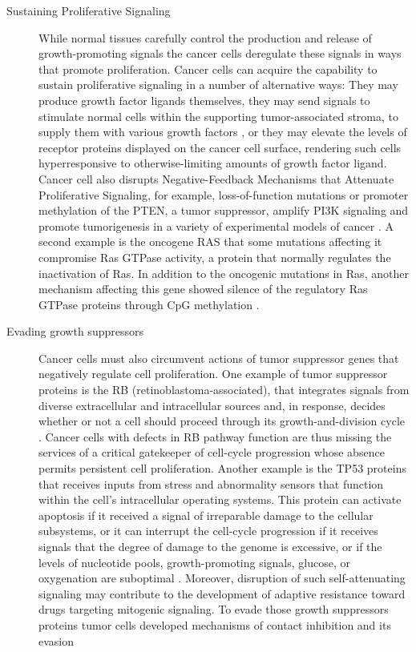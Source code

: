 \begin{description}
  \item [Sustaining Proliferative Signaling]
  While normal tissues carefully control the production and release of growth-promoting
  signals the cancer cells deregulate these signals in ways that promote proliferation.
    Cancer cells can acquire the capability to sustain proliferative signaling in a number of alternative ways: They may produce growth factor ligands themselves, they may send signals to stimulate normal cells within the supporting tumor-associated stroma, to supply them with various growth factors \cite{cheng2008transforming}, or
   they may elevate the levels of receptor proteins displayed on the cancer cell surface,
   rendering such cells hyperresponsive to otherwise-limiting amounts of growth factor ligand.
   Cancer cell also disrupts Negative-Feedback Mechanisms that Attenuate Proliferative Signaling,
   for example,  loss-of-function mutations or promoter methylation of the PTEN, a tumor suppressor, amplify PI3K signaling and promote tumorigenesis in a variety of experimental models of cancer \cite{jiang2009pi3k}. A second example is the oncogene RAS that some mutations affecting it compromise Ras GTPase activity,  a protein that normally regulates the inactivation of Ras. In addition to the oncogenic mutations in Ras, another mechanism affecting this gene showed silence of the regulatory Ras GTPase proteins through CpG methylation \cite{jin2007epigenetic}.
   \item [Evading growth suppressors]  Cancer cells must also circumvent actions of tumor suppressor genes that negatively regulate cell proliferation. One example of tumor suppressor proteins is the  RB (retinoblastoma-associated),
   that integrates signals from diverse extracellular and intracellular sources and, in response, decides whether or not a cell should proceed through its growth-and-division cycle \cite{burkhart2008cellular}.
   Cancer cells with defects in RB pathway function are thus missing the services of a critical gatekeeper of cell-cycle progression whose absence permits persistent cell proliferation. Another example is the TP53 proteins that
    receives inputs from stress and abnormality sensors that function within the cell's intracellular operating systems.
    This protein can activate apoptosis if it received a signal of irreparable damage to the cellular subsystems, or it can
    interrupt the cell-cycle progression if it receives signals that the degree of damage to the genome is excessive, or if the levels of nucleotide pools, growth-promoting signals, glucose, or oxygenation are suboptimal \cite{hanahan2011hallmarks}.
    Moreover, disruption of such self-attenuating
    signaling may contribute to the development of
    adaptive resistance toward drugs targeting mitogenic signaling.
    To evade those growth suppressors proteins tumor cells developed mechanisms of contact inhibition and its evasion


\end{description}
